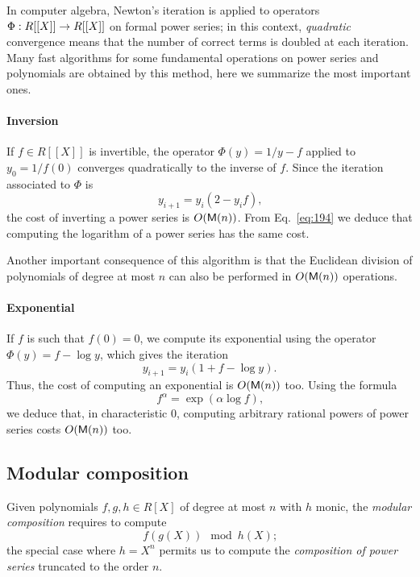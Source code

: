 In computer algebra, Newton's iteration is applied to operators
$\Phi:R[[X]]\rightarrow R[[X]]$ on formal power series; in this context,
\emph{quadratic} convergence means that the number of correct terms is
doubled at each iteration. Many fast algorithms for some fundamental
operations on power series and polynomials are obtained by this
method, here we summarize the most important ones.

\paragraph{Inversion}
If $f\in R[[X]]$ is invertible, the operator $\Phi(y) = 1/y - f$
applied to $y_0=1/f(0)$ converges quadratically to the inverse of
$f$. Since the iteration associated to $\Phi$ is
\begin{equation}
  \label{eq:193}
  y_{i+1} = y_i(2 - y_if)
  \text{,}
\end{equation}
the cost of inverting a power series is $O(\mathsf{M}(n))$. From
Eq.~\eqref{eq:194} we deduce that computing the logarithm of a power
series has the same cost.

Another important consequence of this algorithm is that the Euclidean
division of polynomials of degree at most $n$ can also be performed in
$O(\mathsf{M}(n))$ operations.

\paragraph{Exponential}
If $f$ is such that $f(0)=0$, we compute its exponential using the
operator $\Phi(y)=f-\log y$, which gives the iteration
\begin{equation}
  \label{eq:196}
  y_{i+1} = y_i(1 + f - \log y)
  \text{.}
\end{equation}
Thus, the cost of computing an exponential is $O(\mathsf{M}(n))$ too. Using
the formula
\begin{equation}
  \label{eq:201}
  f^\alpha = \exp(\alpha\log f)
  \text{,}
\end{equation}
we deduce that, in characteristic $0$, computing arbitrary rational
powers of power series costs $O(\mathsf{M}(n))$ too.


\subsection{Modular composition}
\label{sec:modular-composition}
Given polynomials $f,g,h\in R[X]$ of degree at most $n$ with $h$
monic, the \textit{modular composition}
requires to compute
\begin{equation}
  \label{eq:190}
  f(g(X)) \mod h(X)
  \text{;}
\end{equation}
the special case where $h=X^n$ permits us to compute the
\textit{composition of power
  series} truncated to the order $n$.

